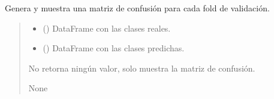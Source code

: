 \documentclass[letterpaper,10pt,spanish]{sphinxmanual}
\begin{document}

\begin{fulllineitems}
\label{\detokenize{Funciones_Visualizacion:leer_metricas.plot_confusion_matrix}}
\pysigstartsignatures
\pysiglinewithargsret
{}
{\sphinxparamcomma {}}
{}
\pysigstopsignatures
\sphinxAtStartPar
Genera y muestra una matriz de confusión para cada fold de validación.
\begin{quote}\begin{description}
\begin{itemize}
\item {} 
\sphinxAtStartPar
{} () \textendash{} DataFrame con las clases reales.

\item {} 
\sphinxAtStartPar
{} () \textendash{} DataFrame con las clases predichas.

\end{itemize}

\sphinxAtStartPar
No retorna ningún valor, solo muestra la matriz de confusión.

\sphinxAtStartPar
None

\end{description}\end{quote}

\end{fulllineitems}

\end{document}
